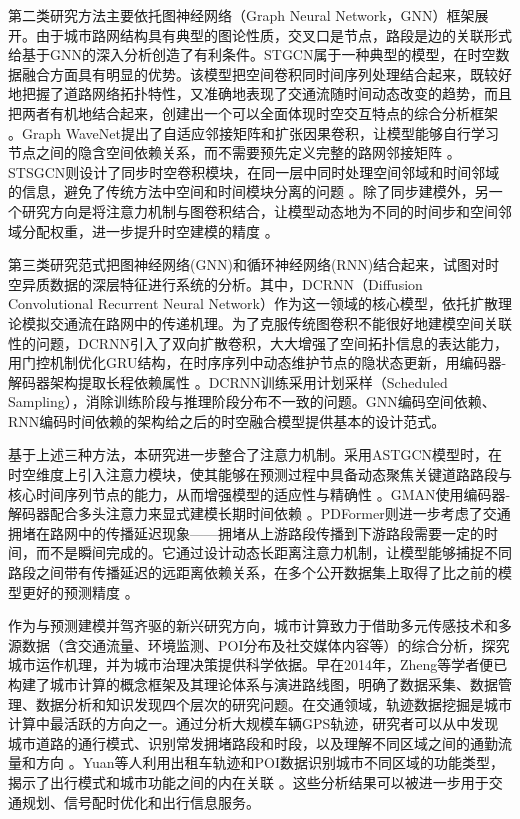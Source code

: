 第二类研究方法主要依托图神经网络（Graph Neural Network，GNN）框架展开。由于城市路网结构具有典型的图论性质，交叉口是节点，路段是边的关联形式给基于GNN的深入分析创造了有利条件。STGCN属于一种典型的模型，在时空数据融合方面具有明显的优势。该模型把空间卷积同时间序列处理结合起来，既较好地把握了道路网络拓扑特性，又准确地表现了交通流随时间动态改变的趋势，而且把两者有机地结合起来，创建出一个可以全面体现时空交互特点的综合分析框架 。Graph WaveNet提出了自适应邻接矩阵和扩张因果卷积，让模型能够自行学习节点之间的隐含空间依赖关系，而不需要预先定义完整的路网邻接矩阵 。STSGCN则设计了同步时空卷积模块，在同一层中同时处理空间邻域和时间邻域的信息，避免了传统方法中空间和时间模块分离的问题 。除了同步建模外，另一个研究方向是将注意力机制与图卷积结合，让模型动态地为不同的时间步和空间邻域分配权重，进一步提升时空建模的精度 。

第三类研究范式把图神经网络(GNN)和循环神经网络(RNN)结合起来，试图对时空异质数据的深层特征进行系统的分析。其中，DCRNN（Diffusion Convolutional Recurrent Neural Network）作为这一领域的核心模型，依托扩散理论模拟交通流在路网中的传递机理。为了克服传统图卷积不能很好地建模空间关联性的问题，DCRNN引入了双向扩散卷积，大大增强了空间拓扑信息的表达能力，用门控机制优化GRU结构，在时序序列中动态维护节点的隐状态更新，用编码器-解码器架构提取长程依赖属性 。DCRNN训练采用计划采样（Scheduled Sampling），消除训练阶段与推理阶段分布不一致的问题。GNN编码空间依赖、RNN编码时间依赖的架构给之后的时空融合模型提供基本的设计范式。

基于上述三种方法，本研究进一步整合了注意力机制。采用ASTGCN模型时，在时空维度上引入注意力模块，使其能够在预测过程中具备动态聚焦关键道路路段与核心时间序列节点的能力，从而增强模型的适应性与精确性 。GMAN使用编码器-解码器配合多头注意力来显式建模长期时间依赖 。PDFormer则进一步考虑了交通拥堵在路网中的传播延迟现象——拥堵从上游路段传播到下游路段需要一定的时间，而不是瞬间完成的。它通过设计动态长距离注意力机制，让模型能够捕捉不同路段之间带有传播延迟的远距离依赖关系，在多个公开数据集上取得了比之前的模型更好的预测精度 。

作为与预测建模并驾齐驱的新兴研究方向，城市计算致力于借助多元传感技术和多源数据（含交通流量、环境监测、POI分布及社交媒体内容等）的综合分析，探究城市运作机理，并为城市治理决策提供科学依据。早在2014年，Zheng等学者便已构建了城市计算的概念框架及其理论体系与演进路线图，明确了数据采集、数据管理、数据分析和知识发现四个层次的研究问题。在交通领域，轨迹数据挖掘是城市计算中最活跃的方向之一。通过分析大规模车辆GPS轨迹，研究者可以从中发现城市道路的通行模式、识别常发拥堵路段和时段，以及理解不同区域之间的通勤流量和方向 。Yuan等人利用出租车轨迹和POI数据识别城市不同区域的功能类型，揭示了出行模式和城市功能之间的内在关联 。这些分析结果可以被进一步用于交通规划、信号配时优化和出行信息服务。

